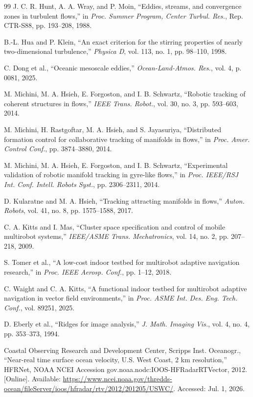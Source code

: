 \documentclass[lettersize,journal]{IEEEtran}
\begin{document}
\begin{thebibliography}{99}
 J. C. R. Hunt, A. A. Wray, and P. Moin, ``Eddies, streams, and
convergence zones in turbulent flows,'' in \textit{Proc. Summer Program,
Center Turbul. Res.}, Rep. CTR-S88, pp. 193--208, 1988.

 B.-L. Hua and P. Klein, ``An exact criterion for the stirring
properties of nearly two-dimensional turbulence,'' \textit{Physica D}, vol. 113,
no. 1, pp. 98--110, 1998.

 C. Dong et al., ``Oceanic mesoscale eddies,''
\textit{Ocean-Land-Atmos. Res.}, vol. 4, p. 0081, 2025.

 M. Michini, M. A. Hsieh, E. Forgoston, and I. B. Schwartz,
``Robotic tracking of coherent structures in flows,'' \textit{IEEE Trans.
Robot.}, vol. 30, no. 3, pp. 593--603, 2014.

 M. Michini, H. Rastgoftar, M. A. Hsieh, and S. Jayasuriya,
``Distributed formation control for collaborative tracking of manifolds in
flows,'' in \textit{Proc. Amer. Control Conf.}, pp. 3874--3880, 2014.

 M. Michini, M. A. Hsieh, E. Forgoston, and I. B. Schwartz,
``Experimental validation of robotic manifold tracking in gyre-like flows,''
in \textit{Proc. IEEE/RSJ Int. Conf. Intell. Robots Syst.},
pp. 2306--2311, 2014.

 D. Kularatne and M. A. Hsieh, ``Tracking attracting manifolds in
flows,'' \textit{Auton. Robots}, vol. 41, no. 8, pp. 1575--1588, 2017.

 C. A. Kitts and I. Mas, ``Cluster space specification and control
of mobile multirobot systems,'' \textit{IEEE/ASME Trans. Mechatronics},
vol. 14, no. 2, pp. 207--218, 2009.

 S. Tomer et al., ``A low-cost indoor testbed for multirobot
adaptive navigation research,'' in \textit{Proc. IEEE Aerosp. Conf.},
pp. 1--12, 2018.

 C. Waight and C. A. Kitts, ``A functional indoor testbed for
multirobot adaptive navigation in vector field environments,'' in
\textit{Proc. ASME Int. Des. Eng. Tech. Conf.}, vol. 89251, 2025.

 D. Eberly et al., ``Ridges for image analysis,''
\textit{J. Math. Imaging Vis.}, vol. 4, no. 4, pp. 353--373, 1994.

 Coastal Observing Research and Development Center, Scripps
Inst. Oceanogr., ``Near-real time surface ocean velocity, U.S. West Coast,
2 km resolution,'' HFRNet, NOAA NCEI Accession
gov.noaa.nodc:IOOS-HFRadarRTVector, 2012. [Online]. Available:
\url{https://www.ncei.noaa.gov/thredds-ocean/fileServer/ioos/hfradar/rtv/2012/201205/USWC/}.
Accessed: Jul. 1, 2026.


\end{thebibliography}
\end{document}
